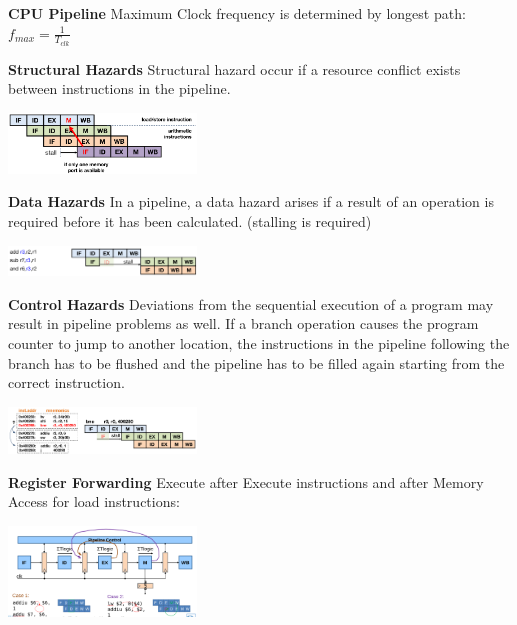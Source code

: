 \documentclass[english]{latex4ei/latex4ei_sheet}
\begin{document}
\textbf{CPU Pipeline} Maximum Clock frequency is determined by longest path: $f_{max} = \frac{1}{T_{clk}}$

\textbf{Structural Hazards} Structural hazard occur if a resource conflict exists between instructions in the pipeline.
\begin{center}
    \includegraphics[width = 5cm]{images/4.ProcessorArchitecture/StrHazard.png}
\end{center}

\textbf{Data Hazards} In a pipeline, a data hazard arises if a result of an operation is required before it has been calculated. (stalling is required)
\begin{center}
    \includegraphics[width = 5cm]{images/4.ProcessorArchitecture/DataHazard.png}
\end{center}

\textbf{Control Hazards} Deviations from the sequential execution of a program may result in pipeline problems as
well. If a branch operation causes the program counter to jump to another location, the instructions in the pipeline following the branch has to be flushed and the pipeline has to be filled again starting from the correct instruction.
\begin{center}
    \includegraphics[width = 5cm]{images/4.ProcessorArchitecture/ControlHazard.png}
\end{center}

\textbf{Register Forwarding}
Execute after Execute instructions and after Memory Access for load instructions:
\begin{center}
    \includegraphics[width = 5cm]{images/4.ProcessorArchitecture/RegisterForwarding.png}
\end{center}
\end{document}
